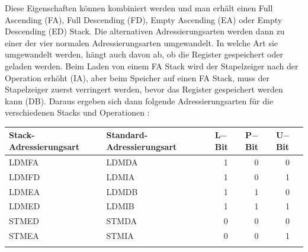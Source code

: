 \documentclass[a4paper, 11pt, onecolumn]{article}
\begin{document}
Diese Eigenschaften können kombiniert werden und man erhält einen Full Ascending (FA), Full Descending (FD), Empty Ascending (EA) oder Empty Descending (ED) Stack. Die alternativen Adressierungsarten werden dann zu einer der vier normalen Adressierungsarten umgewandelt. In welche Art sie umgewandelt werden, hängt auch davon ab, ob die Register gespeichert oder geladen werden. Beim Laden von einem FA Stack wird der Stapelzeiger nach der Operation erhöht (IA), aber beim Speicher auf einen FA Stack, muss der Stapelzeiger zuerst verringert werden, bevor das Register gespeichert werden kann (DB). Daraus ergeben sich dann folgende Adressierungsarten für die verschiedenen Stacks und Operationen \cite{arm:2005}:

\begin{table}[!htb]
\renewcommand*{\arraystretch}{1.25}
\begin{tabular}{llccc}
\hline
\textbf{Stack-Adressierungsart} & \textbf{Standard-Adressierungsart} & \multicolumn{1}{l}{\textbf{L$-$Bit}} & \multicolumn{1}{l}{\textbf{P$-$Bit}} & \multicolumn{1}{l}{\textbf{U$-$Bit}} \\ \hline
LDMFA                           & LDMDA                              & 1                                    & 0                                    & 0                                    \\ \arrayrulecolor[gray]{.7}\hline
LDMFD                           & LDMIA                              & 1                                    & 0                                    & 1                                    \\ \arrayrulecolor[gray]{.7}\hline
LDMEA                           & LDMDB                              & 1                                    & 1                                    & 0                                    \\ \arrayrulecolor[gray]{.7}\hline
LDMED                           & LDMIB                              & 1                                    & 1                                    & 1                                    \\ \arrayrulecolor[gray]{.7}\hline
STMED                           & STMDA                              & 0                                    & 0                                    & 0                                    \\ \arrayrulecolor[gray]{.7}\hline
STMEA                           & STMIA                              & 0                                    & 0                                    & 1                                    \\ \arrayrulecolor[gray]{.7}\hline

\end{tabular}
\end{table}
\end{document}

